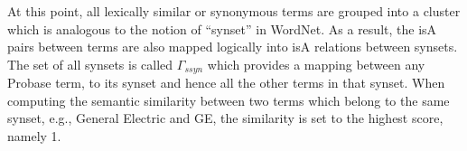 At this point, all lexically similar or synonymous terms are grouped into a
cluster which is analogous to the notion of ``synset'' in WordNet. As a result,
the isA pairs between terms are also mapped logically into isA relations
between synsets.
The set of all synsets is called $\Gamma_{ssyn}$ which provides a mapping between
any Probase term, to its synset and hence all the other terms in that synset.
When computing the semantic similarity between two terms which belong to
the same synset, e.g., General Electric and GE, the similarity is
set to the highest score, namely 1.
%
%

